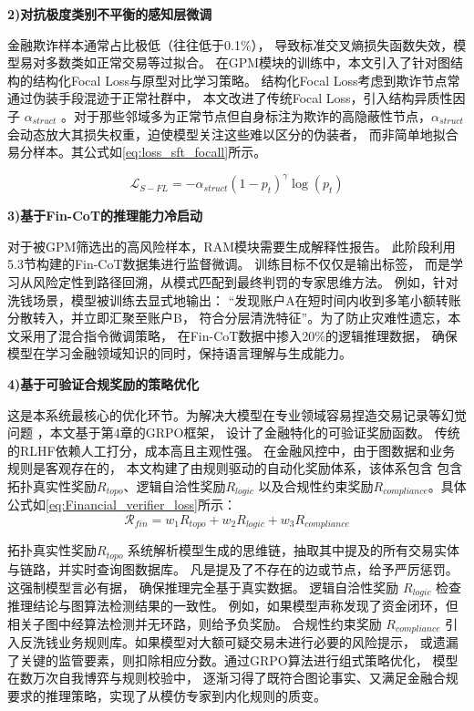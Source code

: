 \textbf{2)对抗极度类别不平衡的感知层微调}

金融欺诈样本通常占比极低（往往低于0.1\%），
导致标准交叉熵损失函数失效，模型易对多数类如正常交易等过拟合。
在GPM模块的训练中，本文引入了针对图结构的结构化Focal Loss与原型对比学习策略。
结构化Focal Loss考虑到欺诈节点常通过伪装手段混迹于正常社群中，
本文改进了传统Focal Loss，引入结构异质性因子 $\alpha_{struct}$
。对于那些邻域多为正常节点但自身标注为欺诈的高隐蔽性节点，$\alpha_{struct}$ 
会动态放大其损失权重，迫使模型关注这些难以区分的伪装者，
而非简单地拟合易分样本。其公式如\ref{eq:loss_sft_focall}所示。

\begin{equation}
    \mathcal{L}_{S-FL} = - \alpha_{struct} (1 - p_t)^\gamma \log(p_t)
    \label{eq:loss_sft_focall}
\end{equation}

\textbf{3)基于Fin-CoT的推理能力冷启动}

对于被GPM筛选出的高风险样本，RAM模块需要生成解释性报告。
此阶段利用5.3节构建的Fin-CoT数据集进行监督微调。
训练目标不仅仅是输出标签，
而是学习从风险定性到路径回溯，从模式匹配到最终判罚的专家思维方法。
例如，针对洗钱场景，模型被训练去显式地输出：
“发现账户A在短时间内收到多笔小额转账分散转入，并立即汇聚至账户B，
符合分层清洗特征”。为了防止灾难性遗忘，本文采用了混合指令微调策略，
在Fin-CoT数据中掺入20\%的逻辑推理数据，
确保模型在学习金融领域知识的同时，保持语言理解与生成能力。

\textbf{4)基于可验证合规奖励的策略优化}

这是本系统最核心的优化环节。为解决大模型在专业领域容易捏造交易记录等幻觉问题
，本文基于第4章的GRPO框架，
设计了金融特化的可验证奖励函数。
传统的RLHF依赖人工打分，成本高且主观性强。
在金融风控中，由于图数据和业务规则是客观存在的，
本文构建了由规则驱动的自动化奖励体系，该体系包含
包含拓扑真实性奖励$R_{topo}$、逻辑自洽性奖励$R_{logic}$
以及合规性约束奖励$R_{compliance}$。具体公式如\ref{eq:Financial_verifier_loss}所示：
\begin{equation}
    \mathcal{R}_{fin} = w_1 R_{topo} + w_2 R_{logic} + w_3 R_{compliance}
    \label{eq:Financial_verifier_loss}
\end{equation}


拓扑真实性奖励$R_{topo}$
系统解析模型生成的思维链，抽取其中提及的所有交易实体与链路，并实时查询图数据库。
凡是提及了不存在的边或节点，给予严厉惩罚。这强制模型言必有据，
确保推理完全基于真实数据。
逻辑自洽性奖励 $R_{logic}$
检查推理结论与图算法检测结果的一致性。
例如，如果模型声称发现了资金闭环，但相关子图中经算法检测并无环路，则给予负奖励。
合规性约束奖励 $R_{compliance}$
引入反洗钱业务规则库。如果模型对大额可疑交易未进行必要的风险提示，
或遗漏了关键的监管要素，则扣除相应分数。通过GRPO算法进行组式策略优化，
模型在数万次自我博弈与规则校验中，
逐渐习得了既符合图论事实、又满足金融合规要求的推理策略，实现了从模仿专家到内化规则的质变。


